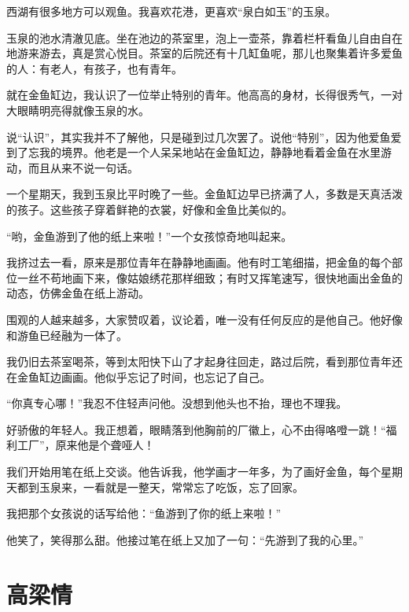 \documentclass[12pt,UTF-8,openany]{ctexbook}
\begin{document}
\begin{Large}
    
    西湖有很多地方可以观鱼。我喜欢花港，更喜欢“泉白如玉”的玉泉。
    
    玉泉的池水清澈见底。坐在池边的茶室里，泡上一壶茶，靠着栏杆看鱼儿自由自在地游来游去，真是赏心悦目。茶室的后院还有十几缸鱼呢，那儿也聚集着许多爱鱼的人：有老人，有孩子，也有青年。
    
    就在金鱼缸边，我认识了一位举止特别的青年。他高高的身材，长得很秀气，一对大眼睛明亮得就像玉泉的水。
    
    说“认识”，其实我并不了解他，只是碰到过几次罢了。说他“特别”，因为他爱鱼爱到了忘我的境界。他老是一个人呆呆地站在金鱼缸边，静静地看着金鱼在水里游动，而且从来不说一句话。
    
    一个星期天，我到玉泉比平时晚了一些。金鱼缸边早已挤满了人，多数是天真活泼的孩子。这些孩子穿着鲜艳的衣裳，好像和金鱼比美似的。
    
    “哟，金鱼游到了他的纸上来啦！”一个女孩惊奇地叫起来。
    
    我挤过去一看，原来是那位青年在静静地画画。他有时工笔细描，把金鱼的每个部位一丝不苟地画下来，像姑娘绣花那样细致；有时又挥笔速写，很快地画出金鱼的动态，仿佛金鱼在纸上游动。
    
    围观的人越来越多，大家赞叹着，议论着，唯一没有任何反应的是他自己。他好像和游鱼已经融为一体了。
    
    我仍旧去茶室喝茶，等到太阳快下山了才起身往回走，路过后院，看到那位青年还在金鱼缸边画画。他似乎忘记了时间，也忘记了自己。
    
    “你真专心哪！”我忍不住轻声问他。没想到他头也不抬，理也不理我。
    
    好骄傲的年轻人。我正想着，眼睛落到他胸前的厂徽上，心不由得咯噔一跳！“福利工厂”，原来他是个聋哑人！
    
    我们开始用笔在纸上交谈。他告诉我，他学画才一年多，为了画好金鱼，每个星期天都到玉泉来，一看就是一整天，常常忘了吃饭，忘了回家。
    
    我把那个女孩说的话写给他：“鱼游到了你的纸上来啦！”
    
    他笑了，笑得那么甜。他接过笔在纸上又加了一句：“先游到了我的心里。”
    
\end{Large}

\chapter{高梁情}
\end{document}
